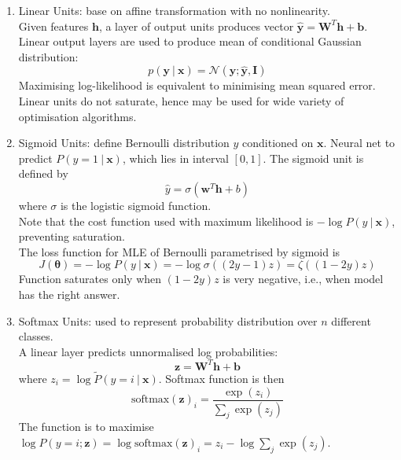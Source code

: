 \begin{definition} 
\begin{enumerate}[label=\roman*.]
\setlength{\itemsep}{0pt}
\item Linear Units: base on affine transformation with no nonlinearity.\\
Given features $\bm{h}$, a layer of output units produces vector $\hat{\bm{y}} = \bm{W}^T \bm{h} + \bm{b}$. Linear output layers are used to produce mean of conditional Gaussian distribution:
\begin{equation*}
p(\bm{y} \ \vert \ \bm{x}) = \mathcal{N}(\bm{y}; \hat{\bm{y}}, \bm{I}) \nonumber
\end{equation*}
Maximising log-likelihood is equivalent to minimising mean squared error.\\
Linear units do not saturate, hence may be used for wide variety of optimisation algorithms.
\item Sigmoid Units: define Bernoulli distribution $y$ conditioned on $\bm{x}$. Neural net to predict $P(y = 1 \ \vert \ \bm{x})$, which lies in interval $[0,1]$. The sigmoid unit is defined by
\begin{equation*}
\hat{y} = \sigma(\bm{w}^T \bm{h} + b) \nonumber
\end{equation*}
where $\sigma$ is the logistic sigmoid function.\\
Note that the cost function used with maximum likelihood is $- \log P(y \ \vert \ \bm{x})$, preventing saturation.\\
The loss function for MLE of Bernoulli parametrised by sigmoid is
\begin{equation*}
J(\bm{\theta}) = - \log P(y \ \vert \ \bm{x}) = - \log \sigma((2y - 1)z) = \zeta((1-2y)z) \nonumber
\end{equation*}
Function saturates only when $(1-2y)z$ is very negative, i.e., when model has the right answer.
\item Softmax Units: used to represent probability distribution over $n$ different classes.\\
A linear layer predicts unnormalised log probabilities:
\begin{equation*}
\bm{z} = \bm{W}^T \bm{h} + \bm{b} \nonumber
\end{equation*}
where $z_i = \log \tilde{P}(y=i \ \vert \ \bm{x})$. Softmax function is then
\begin{equation*}
\text{softmax}(\bm{z})_i = \frac{\exp(z_i)}{\sum_j \exp(z_j)} \nonumber
\end{equation*}
The function is to maximise $\log P(y=i ; \bm{z}) = \log \text{softmax}(\bm{z})_i = z_i - \log \sum_{j} \exp(z_j)$.\\

\end{enumerate}
\end{definition}
